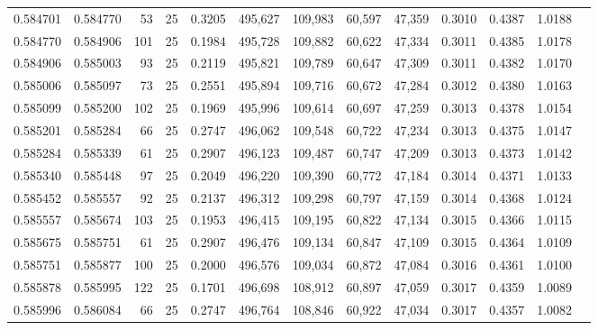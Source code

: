 \begin{tabular}{rrrrrrrrrrrrr}
0.584701 & 0.584770 &    53 &  25 &                                     0.3205 & 495,627 & 109,983 &  60,597 &  47,359 & 0.3010 & 0.4387 & 1.0188 \\
0.584770 & 0.584906 &   101 &  25 &                                     0.1984 & 495,728 & 109,882 &  60,622 &  47,334 & 0.3011 & 0.4385 & 1.0178 \\
0.584906 & 0.585003 &    93 &  25 &                                     0.2119 & 495,821 & 109,789 &  60,647 &  47,309 & 0.3011 & 0.4382 & 1.0170 \\
0.585006 & 0.585097 &    73 &  25 &                                     0.2551 & 495,894 & 109,716 &  60,672 &  47,284 & 0.3012 & 0.4380 & 1.0163 \\
0.585099 & 0.585200 &   102 &  25 &                                     0.1969 & 495,996 & 109,614 &  60,697 &  47,259 & 0.3013 & 0.4378 & 1.0154 \\
0.585201 & 0.585284 &    66 &  25 &                                     0.2747 & 496,062 & 109,548 &  60,722 &  47,234 & 0.3013 & 0.4375 & 1.0147 \\
0.585284 & 0.585339 &    61 &  25 &                                     0.2907 & 496,123 & 109,487 &  60,747 &  47,209 & 0.3013 & 0.4373 & 1.0142 \\
0.585340 & 0.585448 &    97 &  25 &                                     0.2049 & 496,220 & 109,390 &  60,772 &  47,184 & 0.3014 & 0.4371 & 1.0133 \\
0.585452 & 0.585557 &    92 &  25 &                                     0.2137 & 496,312 & 109,298 &  60,797 &  47,159 & 0.3014 & 0.4368 & 1.0124 \\
0.585557 & 0.585674 &   103 &  25 &                                     0.1953 & 496,415 & 109,195 &  60,822 &  47,134 & 0.3015 & 0.4366 & 1.0115 \\
0.585675 & 0.585751 &    61 &  25 &                                     0.2907 & 496,476 & 109,134 &  60,847 &  47,109 & 0.3015 & 0.4364 & 1.0109 \\
0.585751 & 0.585877 &   100 &  25 &                                     0.2000 & 496,576 & 109,034 &  60,872 &  47,084 & 0.3016 & 0.4361 & 1.0100 \\
0.585878 & 0.585995 &   122 &  25 &                                     0.1701 & 496,698 & 108,912 &  60,897 &  47,059 & 0.3017 & 0.4359 & 1.0089 \\
0.585996 & 0.586084 &    66 &  25 &                                     0.2747 & 496,764 & 108,846 &  60,922 &  47,034 & 0.3017 & 0.4357 & 1.0082 \\

\end{tabular}
